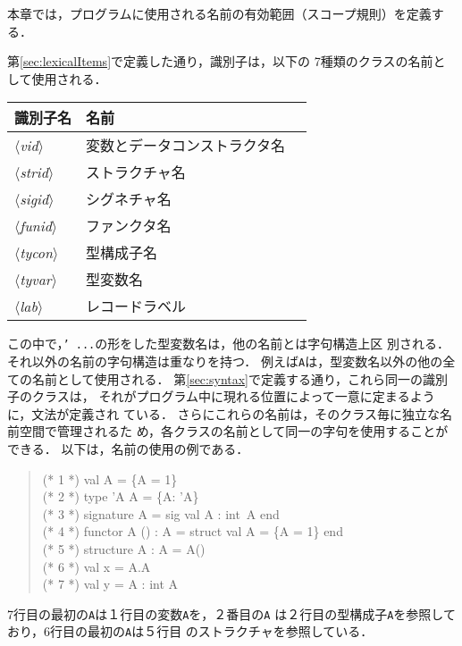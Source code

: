 \documentclass{jbook}
\newcommand{\code}[1]{\mbox{\large\tt #1}}
\newcommand{\nonterm}[1]{\mbox{$\langle$}{\it #1}\mbox{$\rangle$}}
\newenvironment{program}{\begin{quote}\begin{tt}}%
                        {\end{tt}\end{quote}}
\begin{document}
\ifjp%
	本章では，プログラムに使用される名前の有効範囲（スコープ規則）を定義する．

	第\ref{sec:lexicalItems}で定義した通り，識別子は，以下の
7種類のクラスの名前として使用される．

\begin{center}
\begin{tabular}{|l|l|l|}
\hline
識別子名 & 名前\\\hline
\nonterm{vid}   & 変数とデータコンストラクタ名\\
\nonterm{strid} & ストラクチャ名\\
\nonterm{sigid} & シグネチャ名\\
\nonterm{funid} & ファンクタ名\\
\nonterm{tycon} & 型構成子名 \\
\nonterm{tyvar} & 型変数名 \\
\nonterm{lab}   & レコードラベル\\
\hline
\end{tabular}
\end{center}

	この中で，\code{' ...}の形をした型変数名は，他の名前とは字句構造上区
別される．
	それ以外の名前の字句構造は重なりを持つ．
	例えば\code{A}は，型変数名以外の他の全ての名前として使用される．
	第\ref{sec:syntax}で定義する通り，これら同一の識別子のクラスは，
それがプログラム中に現れる位置によって一意に定まるように，文法が定義され
ている．
	さらにこれらの名前は，そのクラス毎に独立な名前空間で管理されるた
め，各クラスの名前として同一の字句を使用することができる．
	以下は，名前の使用の例である．
\begin{program}
(* 1 *) val A = \{A = 1\}\\
(* 2 *) type 'A A =  \{A: 'A\}\\
(* 3 *) signature A = sig val A : int\ A end\\
(* 4 *) functor A () : A = struct val A = \{A = 1\} end\\
(* 5 *) structure A : A = A()\\
(* 6 *) val x = A.A\\
(* 7 *) val y = A : int A
\end{program}
	7行目の最初の\code{A}は１行目の変数\code{A}を，２番目の\code{A}
は２行目の型構成子\code{A}を参照しており，6行目の最初の\code{A}は５行目
のストラクチャを参照している．
\end{document}
